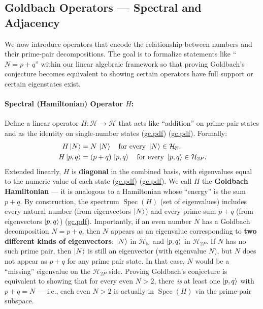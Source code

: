 \documentclass[12pt]{article}
\newcommand{\Spec}{\operatorname{Spec}}
\begin{document}
\subsection{Goldbach Operators --- Spectral and Adjacency}
We now introduce operators that encode the relationship between numbers and their prime-pair decompositions. The goal is to formalize statements like ``$N = p+q$'' within our linear algebraic framework so that proving Goldbach’s conjecture becomes equivalent to showing certain operators have full support or certain eigenstates exist.

\paragraph{Spectral (Hamiltonian) Operator $H$:} Define a linear operator $H:\mathcal{H}\to\mathcal{H}$ that acts like ``addition'' on prime-pair states and as the identity on single-number states (\href{file://file-7ZYYwSHWVa83XEVTrEhg5z#:~:text=Definition%206%20,e)}{gc.pdf}) (\href{file://file-7ZYYwSHWVa83XEVTrEhg5z#:~:text=%E2%97%8F%20%24H%24%20restricted%20to%20%24%5Cmathcal,N%5Crangle)}{gc.pdf}). Formally:
\begin{align*}
H\ket{N} &= N\,\ket{N} \quad \text{for every } \ket{N}\in\mathcal{H}_{\mathbb{N}}, \\
H\ket{p,q} &= (p+q)\,\ket{p,q} \quad \text{for every } \ket{p,q}\in\mathcal{H}_{2P}.
\end{align*}
Extended linearly, $H$ is \textbf{diagonal} in the combined basis, with eigenvalues equal to the numeric value of each state (\href{file://file-7ZYYwSHWVa83XEVTrEhg5z#:~:text=basis%20states%20,By%20construction%2C%20this%20means}{gc.pdf}) (\href{file://file-7ZYYwSHWVa83XEVTrEhg5z#:~:text=%E2%97%8F%20%24H%24%20restricted%20to%20%24%5Cmathcal,pair%20state)}{gc.pdf}). We call $H$ the \textbf{Goldbach Hamiltonian} --- it is analogous to a Hamiltonian whose ``energy'' is the sum $p+q$. By construction, the spectrum $\Spec(H)$ (set of eigenvalues) includes every natural number (from eigenvectors $\ket{N}$) and every prime-sum $p+q$ (from eigenvectors $\ket{p,q}$) (\href{file://file-7ZYYwSHWVa83XEVTrEhg5z#:~:text=basis%20states%20,By%20construction%2C%20this%20means}{gc.pdf}). Importantly, if an even number $N$ has a Goldbach decomposition $N=p+q$, then $N$ appears as an eigenvalue corresponding to \textbf{two different kinds of eigenvectors}: $\ket{N}$ in $\mathcal{H}_{\mathbb{N}}$ and $\ket{p,q}$ in $\mathcal{H}_{2P}$. If $N$ has no such prime pair, then $\ket{N}$ is still an eigenvector (with eigenvalue $N$), but $N$ does not appear as $p+q$ for any prime pair state. In that case, $N$ would be a “missing” eigenvalue on the $\mathcal{H}_{2P}$ side. Proving Goldbach’s conjecture is equivalent to showing that for every even $N>2$, there \emph{is} at least one $\ket{p,q}$ with $p+q=N$ --- i.e., each even $N>2$ is actually in $\Spec(H)$ via the prime-pair subspace.
\end{document}
